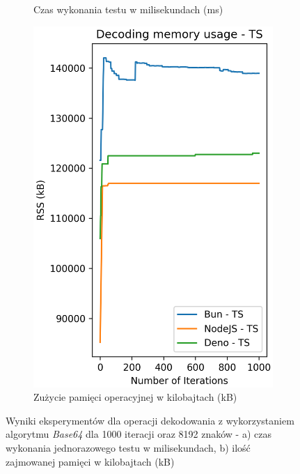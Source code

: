 \begin{figure}[H]
\begin{subfigure}[b]{0.42\textwidth}
    \caption{Czas wykonania testu w milisekundach (ms)}
    \label{fig:decoding_e2_ts_time}
  \end{subfigure}
  \begin{subfigure}[b]{0.42\textwidth}
    \centering
    \includegraphics[width=\textwidth]{Figures/coding/base64_1000_decoding_ts_memory.png}
    \caption{Zużycie pamięci operacyjnej w kilobajtach (kB)}
    \label{fig:decoding_e2_ts_memory}
  \end{subfigure}
  \hfill
  \caption{Wyniki eksperymentów dla operacji dekodowania z wykorzystaniem algorytmu \textit{Base64} dla 1000 iteracji oraz 8192 znaków - a) czas wykonania jednorazowego testu w milisekundach, b) ilość zajmowanej pamięci w kilobajtach (kB)}
  \label{fig:decoding_e2_ts}
\end{figure}


